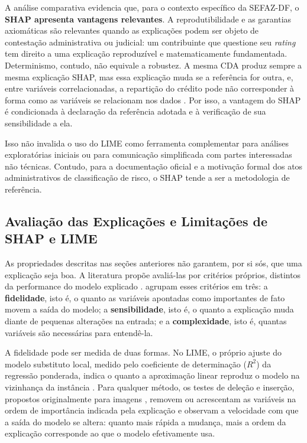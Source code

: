 A análise comparativa evidencia que, para o contexto específico da SEFAZ-DF, o \textbf{SHAP apresenta vantagens relevantes}. A reprodutibilidade e as garantias axiomáticas são relevantes quando as explicações podem ser objeto de contestação administrativa ou judicial: um contribuinte que questione seu \textit{rating} tem direito a uma explicação reproduzível e matematicamente fundamentada. Determinismo, contudo, não equivale a robustez. A mesma CDA produz sempre a mesma explicação SHAP, mas essa explicação muda se a referência for outra, e, entre variáveis correlacionadas, a repartição do crédito pode não corresponder à forma como as variáveis se relacionam nos dados \cite{molnarInterpretableMachineLearning}. Por isso, a vantagem do SHAP é condicionada à declaração da referência adotada e à verificação de sua sensibilidade a ela.

Isso não invalida o uso do LIME como ferramenta complementar para análises exploratórias iniciais ou para comunicação simplificada com partes interessadas não técnicas. Contudo, para a documentação oficial e a motivação formal dos atos administrativos de classificação de risco, o SHAP tende a ser a metodologia de referência.

\subsection{Avaliação das Explicações e Limitações de SHAP e LIME}
\label{subsec:avaliacao_xai}

As propriedades descritas nas seções anteriores não garantem, por si sós, que uma explicação seja boa. A literatura propõe avaliá-las por critérios próprios, distintos da performance do modelo explicado \cite{doshi-velezTowardsRigorousScience2017}.  agrupam esses critérios em três: a \textbf{fidelidade}, isto é, o quanto as variáveis apontadas como importantes de fato movem a saída do modelo; a \textbf{sensibilidade}, isto é, o quanto a explicação muda diante de pequenas alterações na entrada; e a \textbf{complexidade}, isto é, quantas variáveis são necessárias para entendê-la.

A fidelidade pode ser medida de duas formas. No LIME, o próprio ajuste do modelo substituto local, medido pelo coeficiente de determinação ($R^2$) da regressão ponderada, indica o quanto a aproximação linear reproduz o modelo na vizinhança da instância \cite{ribeiroWhyShouldTrust2016}. Para qualquer método, os testes de deleção e inserção, propostos originalmente para imagens \cite{petsiukRISERandomizedInput2018}, removem ou acrescentam as variáveis na ordem de importância indicada pela explicação e observam a velocidade com que a saída do modelo se altera: quanto mais rápida a mudança, mais a ordem da explicação corresponde ao que o modelo efetivamente usa.

